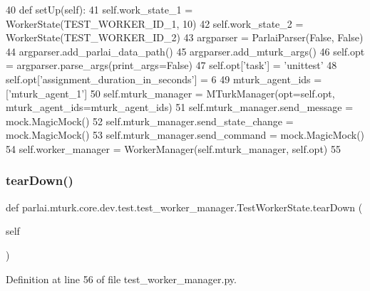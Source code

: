 \begin{DoxyCode}
40     \textcolor{keyword}{def }setUp(self):
41         self.work\_state\_1 = WorkerState(TEST\_WORKER\_ID\_1, 10)
42         self.work\_state\_2 = WorkerState(TEST\_WORKER\_ID\_2)
43         argparser = ParlaiParser(\textcolor{keyword}{False}, \textcolor{keyword}{False})
44         argparser.add\_parlai\_data\_path()
45         argparser.add\_mturk\_args()
46         self.opt = argparser.parse\_args(print\_args=\textcolor{keyword}{False})
47         self.opt[\textcolor{stringliteral}{'task'}] = \textcolor{stringliteral}{'unittest'}
48         self.opt[\textcolor{stringliteral}{'assignment\_duration\_in\_seconds'}] = 6
49         mturk\_agent\_ids = [\textcolor{stringliteral}{'mturk\_agent\_1'}]
50         self.mturk\_manager = MTurkManager(opt=self.opt, mturk\_agent\_ids=mturk\_agent\_ids)
51         self.mturk\_manager.send\_message = mock.MagicMock()
52         self.mturk\_manager.send\_state\_change = mock.MagicMock()
53         self.mturk\_manager.send\_command = mock.MagicMock()
54         self.worker\_manager = WorkerManager(self.mturk\_manager, self.opt)
55 
\end{DoxyCode}
\mbox{\label{classparlai_1_1mturk_1_1core_1_1dev_1_1test_1_1test__worker__manager_1_1TestWorkerState_af37aad66ce19bc0b823d2153977bcf1e}} 
\subsubsection{\texorpdfstring{tear\+Down()}{tearDown()}}
{\footnotesize\ttfamily def parlai.\+mturk.\+core.\+dev.\+test.\+test\+\_\+worker\+\_\+manager.\+Test\+Worker\+State.\+tear\+Down (\begin{DoxyParamCaption}\item[{}]{self }\end{DoxyParamCaption})}



Definition at line 56 of file test\+\_\+worker\+\_\+manager.\+py.


